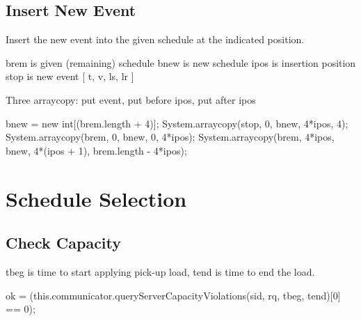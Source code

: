 \section{Insert New Event}

Insert the new event into the given schedule at the indicated position.

brem is given (remaining) schedule
bnew is new schedule
ipos is insertion position
stop is new event [ t, v, ls, lr ]

Three arraycopy: put event, put before ipos, put after ipos

\nwenddocs{}\endmoddef\nwstartdeflinemarkup{}\nwenddeflinemarkup
bnew = new int[(brem.length + 4)];
System.arraycopy(stop, 0, bnew, 4*ipos, 4);
System.arraycopy(brem, 0, bnew, 0, 4*ipos);
System.arraycopy(brem, 4*ipos, bnew, 4*(ipos + 1), brem.length - 4*ipos);
\nwendcode{}\nwdocspar


\nwenddocs{}\chapter{Schedule Selection}
\label{search-schedules}

\section{Check Capacity}

tbeg is time to start applying pick-up load, tend is time to end the load.

\nwenddocs{}\endmoddef\nwstartdeflinemarkup{}\nwenddeflinemarkup
ok = (this.communicator.queryServerCapacityViolations(sid, rq, tbeg, tend)[0] == 0);
\nwendcode{}\nwdocspar

